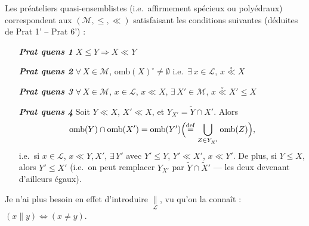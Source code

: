\documentclass[11pt,a4paper]{article}
\begin{document}
Les préateliers quasi-ensemblistes (i.e.\ affirmement spécieux ou polyédraux) correspondent aux $(\mathcal{M}, \leq, \ll)$ satisfaisant les conditions suivantes (déduites de Prat 1' -- Prat 6') :

\begin{itemize}
  \item[\textbf{\emph{Prat quens 1}}] $X \leq Y \Longrightarrow X \ll Y$
  \item[\textbf{\emph{Prat quens 2}}] $\forall\, X \in \mathcal{M}$, $\mathrm{omb}(X)^{\circ} \neq \emptyset$ i.e.\ $\exists\, x \in \mathcal{L}$, $x \overset{\circ}{\ll} X$
  \item[\textbf{\emph{Prat quens 3}}] $\forall\, X \in \mathcal{M}$, $x \in \mathcal{L}$, $x \ll X$, $\exists\, X' \in \mathcal{M}$, $x \overset{\circ}{\ll} X' \leq X$
  \item[\textbf{\emph{Prat quens 4}}] Soit $Y \ll X$, $X' \ll X$,  et $Y_{X'} = \widetilde{Y} \cap X'$. Alors
  \[
    \mathrm{omb}(Y) \cap \mathrm{omb}(X') = \mathrm{omb}(Y') \Bigl( \overset{\mathrm{def}}{=} \bigcup_{Z \in Y_{X'}} \mathrm{omb}(Z) \Bigr) ,
  \]
  i.e.\ si $x \in \mathcal{L}$, $x \ll Y, X'$, $\exists\, Y'$ avec $Y' \leq Y$, $Y' \ll X'$, $x \ll Y'$. De plus, si $Y \leq X$, alors $Y' \leq X'$ (i.e.\ on peut remplacer $Y_{X'}$ par $\widetilde{Y} \cap \widetilde{X}'$ — les deux devenant d'ailleurs égaux).
\end{itemize}

Je n'ai plus besoin en effet d'introduire $\underset{\mathcal{L}}{\parallel}$, vu qu'on la connaît : $(x \parallel y) \iff (x \neq y)$.
\end{document}
